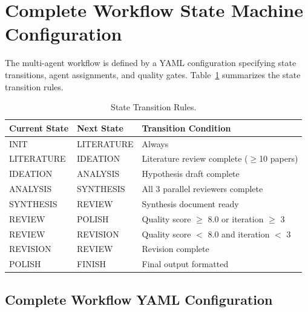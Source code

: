 \documentclass[runningheads]{llncs}
\begin{document}
\section{Complete Workflow State Machine Configuration}
\label{app:workflow_config}

The multi-agent workflow is defined by a YAML configuration specifying state transitions, agent assignments, and quality gates. Table~\ref{tab:state_transitions} summarizes the state transition rules.

\begin{table}[h]
\centering
\small
\begin{tabular}{llp{6cm}}
\toprule
\textbf{Current State} & \textbf{Next State} & \textbf{Transition Condition} \\
\midrule
INIT & LITERATURE & Always \\
LITERATURE & IDEATION & Literature review complete ($\geq$10 papers) \\
IDEATION & ANALYSIS & Hypothesis draft complete \\
ANALYSIS & SYNTHESIS & All 3 parallel reviewers complete \\
SYNTHESIS & REVIEW & Synthesis document ready \\
REVIEW & POLISH & Quality score $\geq$ 8.0 or iteration $\geq$ 3 \\
REVIEW & REVISION & Quality score $<$ 8.0 and iteration $<$ 3 \\
REVISION & REVIEW & Revision complete \\
POLISH & FINISH & Final output formatted \\
\bottomrule
\end{tabular}
\caption{State Transition Rules.}
\label{tab:state_transitions}
\end{table}

\subsection{Complete Workflow YAML Configuration}
\end{document}

